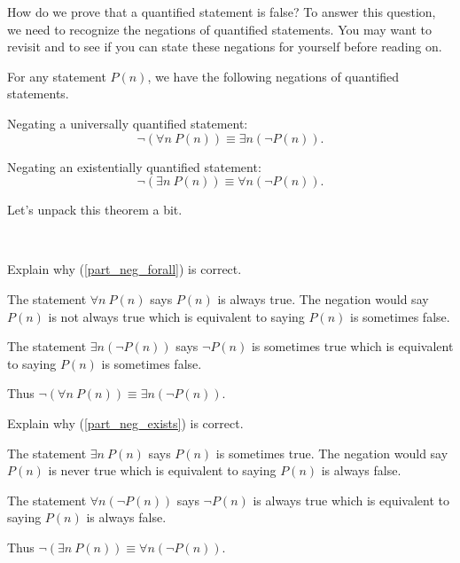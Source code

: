 How do we prove that a quantified statement is false?  To answer this question, we need to recognize the negations of quantified statements.  You may want to revisit  and  to see if you can state these negations for yourself before reading on.

\begin{thm}
\label{thm_neg_quants}
  For any statement $P(n)$, we have the following negations of quantified statements.
    \begin{apart}
        \item \label{part_neg_forall} Negating a universally quantified statement:
            $$\neg \left( \forall n ~ P(n) \right)
            \equiv \exists n (\neg P(n)).$$
        \item \label{part_neg_exists} Negating an existentially quantified statement:
            $$\neg \left( \exists n ~ P(n) \right)
            \equiv \forall n (\neg P(n)).$$
    \end{apart}
\end{thm}

Let's unpack this theorem a bit.

\begin{exam}
\label{exam_neg_forall}
~
    \begin{apart}
        \item Explain why  (\ref{part_neg_forall}) is correct.
            \begin{soln}
                The statement $\forall n ~ P(n)$ says $P(n)$ is always true.  The negation would say $P(n)$ is not always true which is equivalent to saying $P(n)$ is sometimes false.  
                
                The statement $\exists n (\neg P(n))$ says $\neg P(n)$ is sometimes true which is equivalent to saying $P(n)$ is sometimes false.

                Thus $\neg(\forall n ~ P(n)) \equiv \exists n (\neg P(n))$.
            \end{soln}
        \item Explain why  (\ref{part_neg_exists}) is correct.
            \begin{soln}
                The statement $\exists n ~ P(n)$ says $P(n)$ is sometimes true.  The negation would say $P(n)$ is never true which is equivalent to saying $P(n)$ is always false.  
                
                The statement $\forall n (\neg P(n))$ says $\neg P(n)$ is always true which is equivalent to saying $P(n)$ is always false.

                Thus $\neg(\exists n ~ P(n)) \equiv \forall n (\neg P(n))$.
            \end{soln}
    \end{apart}
\end{exam}

